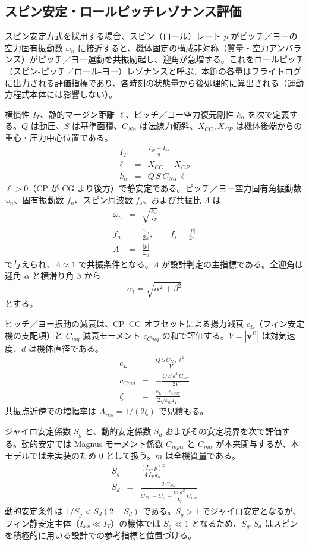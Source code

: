 ﻿\documentclass[a4paper]{jsarticle}
\begin{document}
\subsection{スピン安定・ロールピッチレゾナンス評価}
スピン安定方式を採用する場合、スピン（ロール）レート $p$ がピッチ／ヨーの空力固有振動数 $\omega_n$ に接近すると、機体固定の構成非対称（質量・空力アンバランス）がピッチ／ヨー運動を共振励起し、迎角が急増する。これをロールピッチ（スピン-ピッチ／ロール-ヨー）レゾナンスと呼ぶ。本節の各量はフライトログに出力される評価指標であり、各時刻の状態量から後処理的に算出される（運動方程式本体には影響しない）。

横慣性 $I_T$、静的マージン距離 $\ell$、ピッチ／ヨー空力復元剛性 $k_\alpha$ を次で定義する。$Q$ は動圧、$S$ は基準面積、$C_{N\alpha}$ は法線力傾斜、$X_{CG}, X_{CP}$ は機体後端からの重心・圧力中心位置である。
\begin{eqnarray}
I_T &=& \frac{I_{yy} + I_{zz}}{2} \\
\ell &=& X_{CG} - X_{CP} \\
k_\alpha &=& Q\,S\,C_{N\alpha}\,\ell
\end{eqnarray}
$\ell>0$（CP が CG より後方）で静安定である。ピッチ／ヨー空力固有角振動数 $\omega_n$、固有振動数 $f_n$、スピン周波数 $f_s$、および共振比 $\Lambda$ は
\begin{eqnarray}
\omega_n &=& \sqrt{\frac{k_\alpha}{I_T}} \\
f_n &=& \frac{\omega_n}{2\pi}, \qquad f_s = \frac{|p|}{2\pi} \\
\Lambda &=& \frac{|p|}{\omega_n}
\end{eqnarray}
で与えられ、$\Lambda \approx 1$ で共振条件となる。$\Lambda$ が設計判定の主指標である。全迎角は迎角 $\alpha$ と横滑り角 $\beta$ から
\begin{equation}
\alpha_t = \sqrt{\alpha^2 + \beta^2}
\end{equation}
とする。

ピッチ／ヨー振動の減衰は、CP–CG オフセットによる揚力減衰 $c_L$（フィン安定機の支配項）と $C_{mq}$ 減衰モーメント $c_{Cmq}$ の和で評価する。$V=|\bm{v}^B|$ は対気速度、$d$ は機体直径である。
\begin{eqnarray}
c_L &=& \frac{Q\,S\,C_{N\alpha}\,\ell^2}{V} \\
c_{Cmq} &=& -\frac{Q\,S\,d^2\,C_{mq}}{2V} \\
\zeta &=& \frac{c_L + c_{Cmq}}{2\sqrt{k_\alpha\,I_T}}
\end{eqnarray}
共振点近傍での増幅率は $A_{res} = 1/(2\zeta)$ で見積もる。

ジャイロ安定係数 $S_g$ と、動的安定係数 $S_d$ およびその安定境界を次で評価する。動的安定では Magnus モーメント係数 $C_{mp\alpha}$ と $C_{m\dot\alpha}$ が本来関与するが、本モデルでは未実装のため $0$ として扱う。$m$ は全機質量である。
\begin{eqnarray}
S_g &=& \frac{(I_{xx}\,p)^2}{4\,I_T\,k_\alpha} \\
S_d &=& \frac{2\,C_{N\alpha}}{C_{N\alpha} - C_A - \dfrac{m\,d^2}{I_T}\,C_{mq}}
\end{eqnarray}
動的安定条件は $1/S_g < S_d(2 - S_d)$ である。$S_g > 1$ でジャイロ安定となるが、フィン静安定主体（$I_{xx} \ll I_T$）の機体では $S_g \ll 1$ となるため、$S_g, S_d$ はスピンを積極的に用いる設計での参考指標と位置づける。
\end{document}
